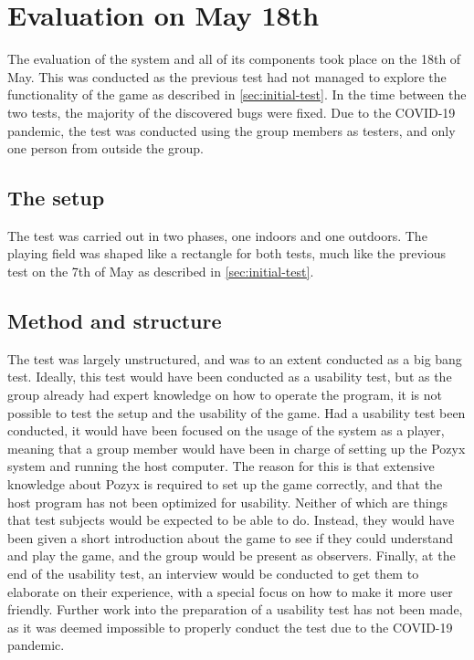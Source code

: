 \section{Evaluation on May 18th}\label{sec:evaluatin_test}
The evaluation of the system and all of its components took place on the 18th of May.
This was conducted as the previous test had not managed to explore the functionality of the game as described in \autoref{sec:initial-test}.
In the time between the two tests, the majority of the discovered bugs were fixed.
Due to the COVID-19 pandemic, the test was conducted using the group members as testers, and only one person from outside the group.

\subsection{The setup}
The test was carried out in two phases, one indoors and one outdoors.
The playing field was shaped like a rectangle for both tests, much like the previous test on the 7th of May as described in \autoref{sec:initial-test}.

\subsection{Method and structure}
The test was largely unstructured, and was to an extent conducted as a big bang test.
Ideally, this test would have been conducted as a usability test, but as the group already had expert knowledge on how to operate the program, it is not possible to test the setup and the usability of the game.
Had a usability test been conducted, it would have been focused on the usage of the system as a player, meaning that a group member would have been in charge of setting up the Pozyx system and running the host computer.
The reason for this is that extensive knowledge about Pozyx is required to set up the game correctly, and that the host program has not been optimized for usability.
Neither of which are things that test subjects would be expected to be able to do.
Instead, they would have been given a short introduction about the game to see if they could understand and play the game, and the group would be present as observers.
Finally, at the end of the usability test, an interview would be conducted to get them to elaborate on their experience, with a special focus on how to make it more user friendly.
Further work into the preparation of a usability test has not been made, as it was deemed impossible to properly conduct the test due to the COVID-19 pandemic.

